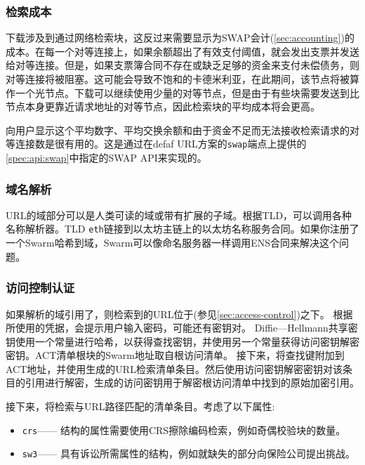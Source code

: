 \subsubsection{检索成本}

下载涉及到通过网络检索块，这反过来需要显示为SWAP会计(\ref{sec:accounting})的成本。在每一个对等连接上，如果余额超出了有效支付阈值，就会发出支票并发送给对等连接。但是，如果支票簿合同不存在或缺乏足够的资金来支付未偿债务，则对等连接将被阻塞。这可能会导致不饱和的卡德米利亚，在此期间，该节点将被算作一个光节点。下载可以继续使用少量的对等节点，但是由于有些块需要发送到比节点本身更靠近请求地址的对等节点，因此检索块的平均成本将会更高。

向用户显示这个平均数字、平均交换余额和由于资金不足而无法接收检索请求的对等连接数是很有用的。这是通过在defaf URL方案的\lstinline{swap}端点上提供的\ref{spec:api:swap}中指定的SWAP API来实现的。


\subsubsection{域名解析}

URL的域部分可以是人类可读的域或带有扩展的子域。根据TLD，可以调用各种名称解析器。TLD \lstinline{eth}链接到以太坊主链上的以太坊名称服务合同。如果你注册了一个Swarm哈希到域，Swarm可以像命名服务器一样调用ENS合同来解决这个问题。 

\subsubsection{访问控制认证}

如果解析的域引用了，则检索到的URL位于(参见\ref{sec:access-control})之下。
根据所使用的凭据，会提示用户输入密码，可能还有密钥对。
Diffie—Hellmann共享密钥使用一个常量进行哈希，以获得查找密钥，并使用另一个常量获得访问密钥解密密钥。ACT清单根块的Swarm地址取自根访问清单。
接下来，将查找键附加到ACT地址，并使用生成的URL检索清单条目。然后使用访问密钥解密密钥对该条目的引用进行解密，生成的访问密钥用于解密根访问清单中找到的原始加密引用。

接下来，将检索与URL路径匹配的清单条目。考虑了以下属性:

\begin{itemize}
    \item \lstinline{crs}——{
    结构的属性需要使用CRS擦除编码检索，例如奇偶校验块的数量}。
    \item \lstinline{sw3}——{ 具有诉讼所需属性的结构，例如就缺失的部分向保险公司提出挑战}。 
\end{itemize}


